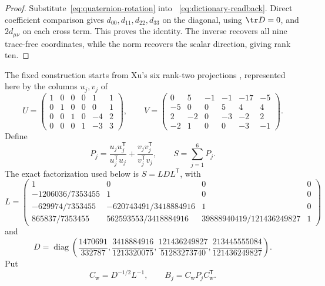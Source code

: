 \begin{proof}
Substitute~\eqref{eq:quaternion-rotation} into
~\eqref{eq:dictionary-readback}.  Direct coefficient comparison gives
$d_{00},d_{11},d_{22},d_{33}$ on the diagonal, using $\tr D=0$, and
$2d_{\mu\nu}$ on each cross term.  This proves the identity.  The inverse recovers
all nine trace-free coordinates, while the norm recovers the scalar
direction, giving rank ten.
\end{proof}

The fixed construction starts from Xu's six rank-two projections
\cite[Theorem~4.2]{Xu2018}, represented here by the columns $u_j,v_j$ of
\begin{equation}\label{eq:exact-uv}
U=\begin{pmatrix}
1&0&0&0&1&1\\
0&1&0&0&0&1\\
0&0&1&0&-4&2\\
0&0&0&1&-3&3
\end{pmatrix},\qquad
V=\begin{pmatrix}
0&5&-1&-1&-17&-5\\
-5&0&0&5&4&4\\
2&-2&0&-3&-2&2\\
-2&1&0&0&-3&-1
\end{pmatrix}.
\end{equation}
Define
\begin{equation}\label{eq:projectors}
 P_j=\frac{u_ju_j^\mathsf T}{u_j^\mathsf Tu_j}
     +\frac{v_jv_j^\mathsf T}{v_j^\mathsf Tv_j},
\qquad S=\sum_{j=1}^6P_j.
\end{equation}
The exact factorization used below is $S=LDL^\mathsf T$, with
\begin{equation}\label{eq:L-factor}
L=\begin{pmatrix}
1&0&0&0\\
-1206036/7353455&1&0&0\\
-629974/7353455&-620743491/3418884916&1&0\\
865837/7353455&562593553/3418884916&
39888940419/121436249827&1
\end{pmatrix}
\end{equation}
and
\begin{equation}\label{eq:D-factor}
D=\operatorname{diag}\!\left(
\frac{1470691}{332787},
\frac{3418884916}{1213320075},
\frac{121436249827}{51283273740},
\frac{213445555084}{121436249827}
\right).
\end{equation}
Put
\begin{equation}\label{eq:whitening}
 C_{\mathrm w}=D^{-1/2}L^{-1},\qquad
 B_j=C_{\mathrm w}P_jC_{\mathrm w}^{\mathsf T}.
\end{equation}

